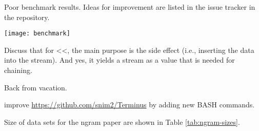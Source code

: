 \documentclass[a4paper]{tufte-handout}
\begin{document}
\hrulefill



Poor benchmark results. Ideas for improvement are listed in the issue tracker in the repository.

\texttt{[image: benchmark]}

\hrulefill


Discuss that for <<, the main purpose is the side effect (i.e., inserting the data into the stream). And yes, it yields a stream as a value that is needed for chaining.

Back from vacation.

 improve \url{https://github.com/snim2/Terminus} by adding new BASH commands.

Size of data sets for the ngram paper are shown in Table \ref{tab:ngram-sizes}.
\end{document}
